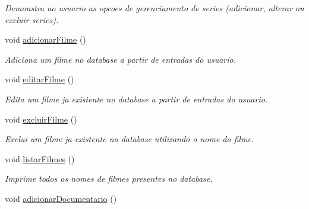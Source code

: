 \begin{DoxyCompactItemize}
\begin{DoxyCompactList}\small\item\em Demonstra ao usuario as opcoes de gerenciamento de series (adicionar, alterar ou excluir series). \end{DoxyCompactList}\item 
void \hyperlink{classController_a84fb77c50f103ab5c46f6666c7aff7a0}{adicionar\+Filme} ()\hypertarget{classController_a84fb77c50f103ab5c46f6666c7aff7a0}{}\label{classController_a84fb77c50f103ab5c46f6666c7aff7a0}

\begin{DoxyCompactList}\small\item\em Adiciona um filme no database a partir de entradas do usuario. \end{DoxyCompactList}\item 
void \hyperlink{classController_a2b1e0e97b5888d2afffb1aa26429d9b2}{editar\+Filme} ()\hypertarget{classController_a2b1e0e97b5888d2afffb1aa26429d9b2}{}\label{classController_a2b1e0e97b5888d2afffb1aa26429d9b2}

\begin{DoxyCompactList}\small\item\em Edita um filme ja existente no database a partir de entradas do usuario. \end{DoxyCompactList}\item 
void \hyperlink{classController_a43ee7965a996cd4ae8d9ae0638b5ce4f}{excluir\+Filme} ()\hypertarget{classController_a43ee7965a996cd4ae8d9ae0638b5ce4f}{}\label{classController_a43ee7965a996cd4ae8d9ae0638b5ce4f}

\begin{DoxyCompactList}\small\item\em Exclui um filme ja existente no database utilizando o nome do filme. \end{DoxyCompactList}\item 
void \hyperlink{classController_aa0344ce7ffd9f77dfbe46ae847736a6a}{listar\+Filmes} ()\hypertarget{classController_aa0344ce7ffd9f77dfbe46ae847736a6a}{}\label{classController_aa0344ce7ffd9f77dfbe46ae847736a6a}

\begin{DoxyCompactList}\small\item\em Imprime todos os nomes de filmes presentes no database. \end{DoxyCompactList}\item 
void \hyperlink{classController_a650b48667267003895f810591ad2bee0}{adicionar\+Documentario} ()\hypertarget{classController_a650b48667267003895f810591ad2bee0}{}\label{classController_a650b48667267003895f810591ad2bee0}


\end{DoxyCompactItemize}
